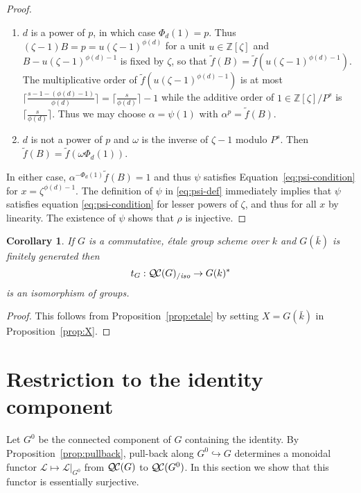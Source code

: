 \documentclass[11pt]{amsart}
\theoremstyle{plain}
\newtheorem{corollary}[theorem]{Corollary}
\theoremstyle{definition}
\theoremstyle{remark}
\newcommand{\ZZ}{{\mathbb{Z}}}
\newcommand{\bFq}{\bar{k}}
\newcommand{\Fq}{k}
\newcommand{\qcs}[1]{{\mathcal{#1}}}
\newcommand{\QC}{{\mathcal{Q\hskip-0.8pt C}}}
\newcommand{\QCiso}[1]{\QC(#1)_{/\textit{iso}}}
\newcommand{\trFrob}[1]{t_{#1}}
\begin{document}
\begin{proof}
  \begin{enumerate}
  \item $d$ is a power of $p$, in which case $\Phi_d(1) = p$.  Thus
    $(\zeta-1)B = p = u(\zeta-1)^{\phi(d)}$ for a unit $u \in \ZZ[\zeta]$
    and $B - u(\zeta-1)^{\phi(d)-1}$ is fixed by $\zeta$,
    so that $\tilde{f}(B) = \tilde{f}(u(\zeta - 1)^{\phi(d)-1})$.  The
    multiplicative order of $\tilde{f}(u(\zeta-1)^{\phi(d)-1})$ is at most
    $\lceil \frac{s - 1 - (\phi(d)-1)}{\phi(d)}\rceil = \lceil \frac{s}{\phi(d)} \rceil - 1$
    while the additive order of $1 \in \ZZ[\zeta]/P^s$ is $\lceil \frac{s}{\phi(d)} \rceil$.
    Thus we may choose $\alpha = \psi(1)$ with $\alpha^p = \tilde{f}(B)$.
  \item $d$ is not a power of $p$ and $\omega$ is the inverse of
    $\zeta-1$ modulo $P^s$.  Then $\tilde{f}(B) = \tilde{f}(\omega\Phi_d(1))$.
  \end{enumerate}
  In either case, $\alpha^{-\Phi_d(1)}\tilde{f}(B) = 1$ and thus
  $\psi$ satisfies Equation~\eqref{eq:psi-condition} for
  $x = \zeta^{\phi(d)-1}$.  The definition of $\psi$ in \ref{eq:psi-def}
  immediately implies that $\psi$ satisfies equation
  \ref{eq:psi-condition} for lesser powers of $\zeta$, and thus for
  all $x$ by linearity.  The existence of $\psi$ shows that $\rho$ is injective.
\end{proof}

\begin{corollary}
 If $G$ is a commutative, \'etale group scheme over $\Fq$ and $G(\bFq)$ is finitely
 generated then
  \[
  \trFrob{G} : \QCiso{G} \to G(\Fq)^*
  \]
  is an isomorphism of groups.
\end{corollary}
\begin{proof}
This follows from Proposition~\ref{prop:etale} by setting $X=G(\bFq)$ in Proposition~\ref{prop:X}.
\end{proof}

\section{Restriction to the identity component} \label{sec:restriction}

%

Let $G^0$ be the connected component of $G$ containing the identity.
By Proposition~\ref{prop:pullback}, pull-back along
$G^0\hookrightarrow G$ determines a monoidal functor
$\qcs{L}\mapsto \qcs{L}\vert_{G^0}$ from $\QC(G)$ to $\QC(G^0)$.  In
this section we show that this functor is essentially surjective. 
\end{document}
